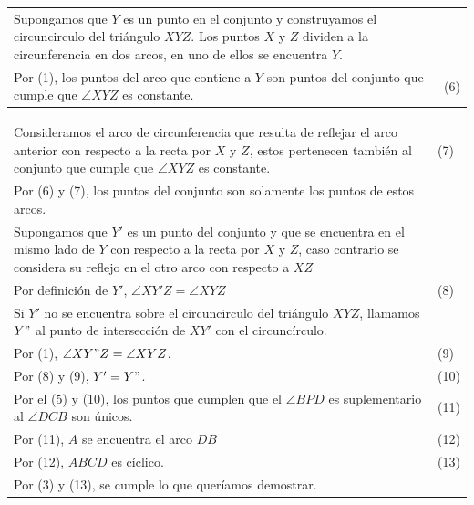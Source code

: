 \documentclass[12pt,a4paper, oneside]{book}
\begin{document}
\begin{tabular}{p{15.9 cm} p{1cm}}
\\Supongamos que $Y$ es un punto en el conjunto y construyamos el circuncirculo del triángulo $XYZ$. Los puntos $X$ y $Z$ dividen a la circunferencia en dos arcos, en uno de ellos se encuentra $Y$.
\\Por (1), los puntos del arco que contiene a $Y$ son puntos del conjunto que cumple que $\angle XYZ$ es constante. & \medskip(6)
\end{tabular}
\begin{tabular}{p{15.9 cm} p{1cm}}
\\Consideramos el arco de circunferencia que resulta de reflejar el arco anterior con respecto a la recta por $X$ y $Z$, estos pertenecen también al conjunto que cumple que $\angle XYZ$ es constante.&\medskip\medskip(7)
\\Por (6) y (7), los puntos del conjunto son solamente los puntos de estos arcos.
\\Supongamos que $Y'$ es un punto del conjunto y que se encuentra en el mismo lado de $Y$ con respecto a la recta por $X$ y $Z$, caso contrario se considera su reflejo en el otro arco con respecto a $XZ$
\\Por definición de $Y'$, $\angle XY'Z= \angle XYZ$ & (8)
\\Si $Y'$ no se encuentra sobre el circuncirculo del triángulo $XYZ$, llamamos $Y"$ al punto de intersección de $XY'$ con el circuncírculo.
\\Por (1), $\angle XY"Z= \angle XYZ$. &(9)
\\Por (8) y (9), $Y'=Y"$.&(10)
\\Por el (5) y (10), los puntos que cumplen que el $\angle BPD$ es suplementario al $\angle DCB$ son únicos.&(11)
\\Por (11), $A$ se encuentra el arco $DB$ &(12)
\\Por (12), $ABCD$ es cíclico. &(13)
\\Por (3) y (13), se cumple lo que queríamos demostrar.
\end{tabular}
\end{document}
